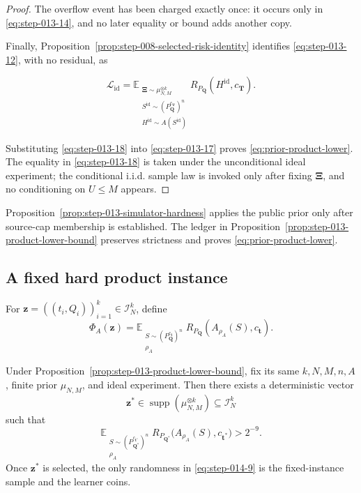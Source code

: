 \begin{proof}
The overflow event has been charged exactly once: it occurs only in \eqref{eq:step-013-14},
and no later equality or bound adds another copy.

Finally, Proposition~\ref{prop:step-008-selected-risk-identity}
identifies \eqref{eq:step-013-12}, with no residual, as

\[
\mathcal L_{\mathrm{id}}
=
\mathbb E_{\substack{\boldsymbol\Xi\sim\mu_{N,M}^{\otimes k}\\
                      S^{\mathrm{id}}\sim
                      (P_{\boldsymbol Q}^{c_{\boldsymbol T}})^n\\
                      H^{\mathrm{id}}\sim A(S^{\mathrm{id}})}}
R_{P_{\boldsymbol Q}}(H^{\mathrm{id}},c_{\boldsymbol T}).
\tag{S13.18}\label{eq:step-013-18}
\]

Substituting \eqref{eq:step-013-18} into \eqref{eq:step-013-17} proves \eqref{eq:prior-product-lower}. The equality in \eqref{eq:step-013-18} is taken under
the unconditional ideal experiment; the conditional i.i.d. sample law is
invoked only after fixing \(\boldsymbol\Xi\), and no conditioning on
\(U\le M\) appears. \end{proof}
Proposition~\ref{prop:step-013-simulator-hardness} applies the public prior
only after source-cap membership is established.  The ledger in
Proposition~\ref{prop:step-013-product-lower-bound} preserves strictness and
proves \eqref{eq:prior-product-lower}.

\subsection{A fixed hard product instance}\label{app:step-014}
For $\boldsymbol z=((t_i,Q_i))_{i=1}^k\in\mathcal I_N^k$, define
\begin{equation}
\Phi_A(\boldsymbol z)
=\mathbb E_{\substack{S\sim(P_{\boldsymbol Q}^{c_{\boldsymbol t}})^n\\
\rho_A}}
R_{P_{\boldsymbol Q}}(A_{\rho_A}(S),c_{\boldsymbol t}).
\tag{S14.3}\label{eq:fixed-instance-functional}
\end{equation}
\begin{proposition}\label{prop:step-014-fixed-extraction}
Under Proposition~\ref{prop:step-013-product-lower-bound}, fix its
same \(k,N,M,n,A\), finite prior \(\mu_{N,M}\), and ideal experiment. Then
there exists a deterministic vector
\[
\boldsymbol z^*\in\operatorname{supp}(\mu_{N,M}^{\otimes k})
\subseteq\mathcal I_N^k
\tag{S14.8}\label{eq:step-014-8}
\]
such that
\[
\mathbb E_{\substack{S\sim(P_{\boldsymbol Q^*}^{c_{\boldsymbol t^*}})^n\\
\rho_A}}
R_{P_{\boldsymbol Q^*}}\bigl(A_{\rho_A}(S),c_{\boldsymbol t^*}\bigr)
>2^{-9}.
\tag{S14.9}\label{eq:step-014-9}
\]
Once \(\boldsymbol z^*\) is selected, the only randomness in \eqref{eq:step-014-9} is the
fixed-instance sample and the learner coins.
\end{proposition}

